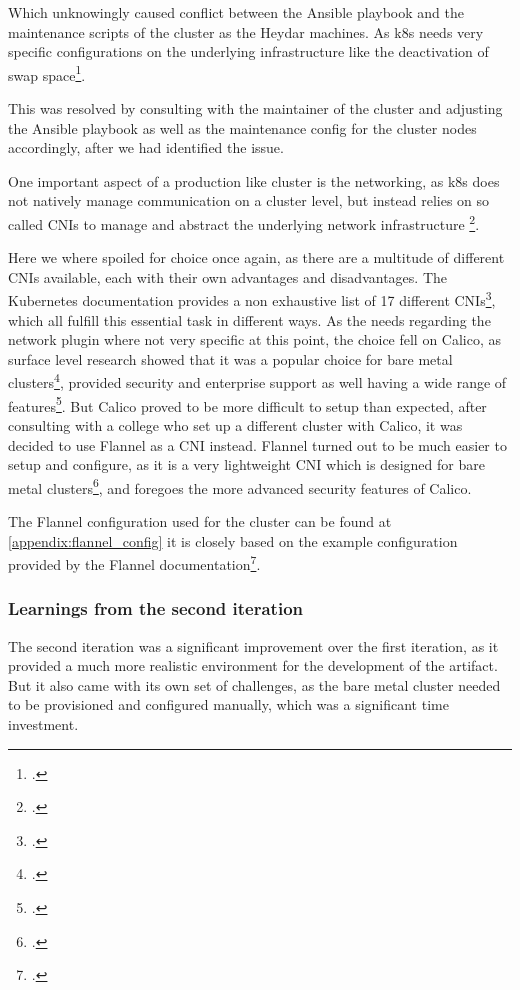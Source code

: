 Which unknowingly caused conflict between the Ansible playbook and the maintenance scripts of the cluster as the Heydar machines.
As \ac{k8s} needs very specific configurations on the underlying infrastructure like the deactivation of swap space\footcite{InstallingKubeadm}.

This was resolved by consulting with the maintainer of the cluster and adjusting the Ansible playbook as well as the maintenance config for the cluster nodes accordingly, 
after we had identified the issue.


One important aspect of a production like cluster is the networking, as \ac{k8s} does not natively manage communication on a cluster level,
but instead relies on so called \ac{CNI}s to manage and abstract the underlying network infrastructure \footcite{ClusterNetworking}.

Here we where spoiled for choice once again, as there are a multitude of different \ac{CNI}s available, each with their own advantages and disadvantages.
The Kubernetes documentation provides a non exhaustive list of 17 different \ac{CNI}s\footcite{KubernetesCNIPlugins}, which all fulfill this essential task in different ways.
As the needs regarding the network plugin where not very specific at this point, the choice fell on Calico, as surface level research showed that it was a popular choice for bare metal clusters\footcite{ExploreNetworkPlugins},
provided security and enterprise support as well having a wide range of features\footcite{mehndirattaComparingKubernetesContainer}.
But Calico proved to be more difficult to setup than expected, after consulting with a college who set up a different cluster with Calico,
it was decided to use Flannel as a \ac{CNI} instead.
Flannel turned out to be much easier to setup and configure, as it is a very lightweight \ac{CNI} which is designed for bare metal clusters\footcite{Flannel2023}, 
and foregoes the more advanced security features of Calico. 

The Flannel configuration used for the cluster can be found at \ref{appendix:flannel_config} it is closely based on the example configuration provided by the Flannel documentation\footcite{FlannelInstallConfig}.

\subsubsection*{Learnings from the second iteration}

The second iteration was a significant improvement over the first iteration, as it provided a much more realistic environment for the development of the artifact.
But it also came with its own set of challenges, as the bare metal cluster needed to be provisioned and configured manually, which was a significant time investment.

